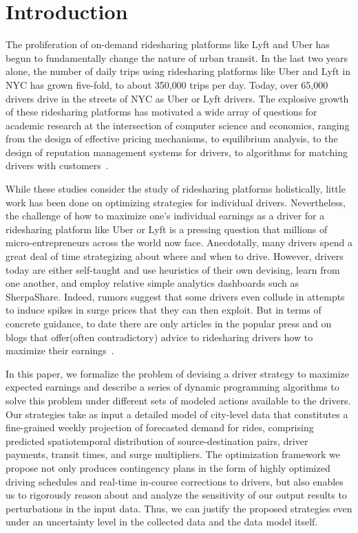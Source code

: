 
\section{Introduction}
\label{sec:introduction}

The proliferation of on-demand ridesharing platforms like Lyft and Uber
  has begun to fundamentally change the nature of urban transit. 
In the last two years alone, the number of daily trips using ridesharing 
  platforms like Uber and Lyft in NYC has grown five-fold, 
  to about 350,000 trips per day. 
Today, over 65,000 drivers drive in the streets of NYC as Uber or Lyft drivers.
The explosive growth of these ridesharing platforms has motivated a wide
  array of questions for academic research at the intersection of computer
  science and economics, ranging from the design of effective pricing mechanisms, 
  to equilibrium analysis, to the design of reputation management systems for 
  drivers, to algorithms for matching drivers with 
  customers~\cite{banerjee2015pricing,ozkan2016dynamic}.

While these studies consider the study of ridesharing platforms holistically, 
   little work has been done on optimizing strategies for individual drivers. 
Nevertheless, the challenge of how to maximize one's individual earnings as a driver for a 
ridesharing platform like Uber or Lyft is a pressing question that millions of micro-entrepreneurs 
across the world now face.  Anecdotally, many drivers spend a great deal of time 
strategizing about where and when to drive.  However, drivers today are either
self-taught and use heuristics of their own devising, learn from one another, 
and employ relative simple analytics dashboards such as SherpaShare.
Indeed, rumors suggest that some drivers even collude in attempts to induce spikes in surge prices that they can then exploit.
But in terms of concrete guidance, to date there are only articles in the
  popular press and on blogs that offer(often contradictory) advice to ridesharing drivers 
  how to maximize their earnings~\cite{dont,tips,sherpashareNYT}.

In this paper, we formalize the problem of devising a driver strategy to maximize expected 
 earnings and describe a series of dynamic programming algorithms to solve this problem
 under different sets of modeled actions available to the drivers. 
Our strategies take as input a detailed model of city-level data that constitutes a 
  fine-grained weekly projection of forecasted demand for rides, comprising 
  predicted spatiotemporal distribution of source-destination pairs, driver payments,
  transit times, and surge multipliers. 
The optimization framework we propose not only produces contingency plans in the form of
  highly optimized driving schedules and real-time in-course corrections to drivers, but 
  also enables us to rigorously reason about and analyze the sensitivity of our output 
  results to perturbations in the input data.  
Thus, we can justify the proposed strategies even under an uncertainty level in the
  collected data and the data model itself.
  
